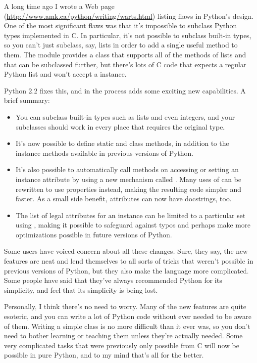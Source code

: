 \documentclass{howto}
\begin{document}
A long time ago I wrote a Web page
(\url{http://www.amk.ca/python/writing/warts.html}) listing flaws in
Python's design.  One of the most significant flaws was that it's
impossible to subclass Python types implemented in C.  In particular,
it's not possible to subclass built-in types, so you can't just
subclass, say, lists in order to add a single useful method to them.
The  module provides a class that supports all of the
methods of lists and that can be subclassed further, but there's lots
of C code that expects a regular Python list and won't accept a
 instance.

Python 2.2 fixes this, and in the process adds some exciting new
capabilities.  A brief summary:

\begin{itemize}

\item You can subclass built-in types such as lists and even integers,
and your subclasses should work in every place that requires the
original type.

\item It's now possible to define static and class methods, in addition
to the instance methods available in previous versions of Python.

\item It's also possible to automatically call methods on accessing or
setting an instance attribute by using a new mechanism called
.  Many uses of  can be rewritten
to use properties instead, making the resulting code simpler and
faster.  As a small side benefit, attributes can now have docstrings,
too.

\item The list of legal attributes for an instance can be limited to a
particular set using , making it possible to safeguard
against typos and perhaps make more optimizations possible in future
versions of Python.

\end{itemize}

Some users have voiced concern about all these changes.  Sure, they
say, the new features are neat and lend themselves to all sorts of
tricks that weren't possible in previous versions of Python, but
they also make the language more complicated.  Some people have said
that they've always recommended Python for its simplicity, and feel
that its simplicity is being lost.

Personally, I think there's no need to worry.  Many of the new
features are quite esoteric, and you can write a lot of Python code
without ever needed to be aware of them.  Writing a simple class is no
more difficult than it ever was, so you don't need to bother learning
or teaching them unless they're actually needed.  Some very
complicated tasks that were previously only possible from C will now
be possible in pure Python, and to my mind that's all for the better.
\end{document}

